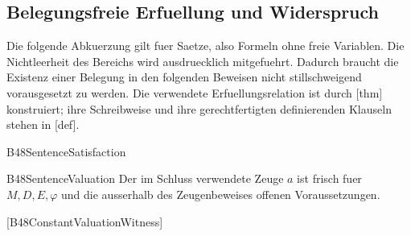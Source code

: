 \subsection{Belegungsfreie Erfuellung und Widerspruch}

Die folgende Abkuerzung gilt fuer Saetze, also Formeln ohne freie
Variablen. Die Nichtleerheit des Bereichs wird ausdruecklich
mitgefuehrt. Dadurch braucht die Existenz einer Belegung in den
folgenden Beweisen nicht stillschweigend vorausgesetzt zu werden.
Die verwendete Erfuellungsrelation ist durch
[thm] konstruiert; ihre
Schreibweise und ihre gerechtfertigten definierenden Klauseln stehen in
[def].

{B48SentenceSatisfaction}{
}

{B48SentenceValuation}{
}
Der im Schluss verwendete Zeuge \(a\) ist frisch fuer \(M,D,E,\varphi\)
und die ausserhalb des Zeugenbeweises offenen Voraussetzungen.
\begin{tabproofsplitwide}
 [B48ConstantValuationWitness]
 \closeproofpartwideindR

 \closeproofpartwide
\end{tabproofsplitwide}

